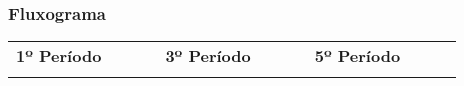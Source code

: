 \begin{landscape}

\subsubsection{Fluxograma}


\begin{table}[h!]
\centering
\tiny
\label{my-label}
\begin{tabular}{lcllcllcllcllcllcl}
\multicolumn{3}{c}{{\bf 1º Período}}                                                                                                                                                & \multicolumn{3}{c}{\cellcolor[HTML]{C0C0C0}{\bf 2º Período}}                                                                                                                                                                                                  & \multicolumn{3}{c}{{\bf 3º Período}}                                                                                                                                               & \multicolumn{3}{c}{\cellcolor[HTML]{C0C0C0}{\bf 4º Período}}                                                                                                                                                                                        & \multicolumn{3}{c}{{\bf 5º Período}}                                                                                                                                                          & \multicolumn{3}{c}{\cellcolor[HTML]{C0C0C0}{\bf 6º Período}}                                                                                                                                                                                                    \\
                          & \multicolumn{1}{l}{}                                                                                                     &                              &                                                 & \multicolumn{1}{l}{}                                                                                                                                &                                                       &                         & \multicolumn{1}{l}{}                                                                                                     &                               &                                                 & \multicolumn{1}{l}{}                                                                                                                      &                                                       &                         & \multicolumn{1}{l}{}                                                                                                                &                               &                                                 & \multicolumn{1}{l}{}                                                                                                                                  &                                                       \\ \hline

\end{tabular}
\end{table}
\end{landscape}
